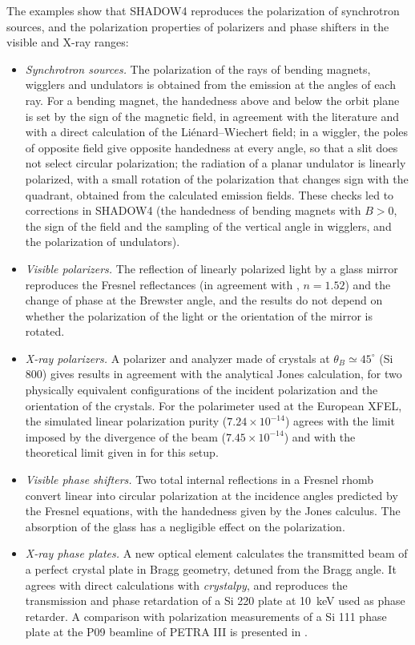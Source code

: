 \documentclass{iucr}
\begin{document}
The examples show that SHADOW4 reproduces the polarization of synchrotron sources, and the polarization properties of polarizers and phase shifters in the visible and X-ray ranges:
\begin{itemize}
\item {\it Synchrotron sources.} The polarization of the rays of bending magnets, wigglers and undulators is obtained from the emission at the angles of each ray. For a bending magnet, the handedness above and below the orbit plane is set by the sign of the magnetic field, in agreement with the literature and with a direct calculation of the Li\'enard--Wiechert field; in a wiggler, the poles of opposite field give opposite handedness at every angle, so that a slit does not select circular polarization; the radiation of a planar undulator is linearly polarized, with a small rotation of the polarization that changes sign with the quadrant, obtained from the calculated emission fields. These checks led to corrections in SHADOW4 (the handedness of bending magnets with $B>0$, the sign of the field and the sampling of the vertical angle in wigglers, and the polarization of undulators).
\item {\it Visible polarizers.} The reflection of linearly polarized light by a glass mirror reproduces the Fresnel reflectances (in agreement with \cite{born_wolf}, $n=1.52$) and the change of phase at the Brewster angle, and the results do not depend on whether the polarization of the light or the orientation of the mirror is rotated.
\item {\it X-ray polarizers.} A polarizer and analyzer made of crystals at $\theta_B\simeq45^\circ$ (Si 800) gives results in agreement with the analytical Jones calculation, for two physically equivalent configurations of the incident polarization and the orientation of the crystals. For the polarimeter used at the European XFEL, the simulated linear polarization purity ($7.24\times10^{-14}$) agrees with the limit imposed by the divergence of the beam ($7.45\times10^{-14}$) and with the theoretical limit given in \cite{Schulze2022} for this setup.
\item {\it Visible phase shifters.} Two total internal reflections in a Fresnel rhomb convert linear into circular polarization at the incidence angles predicted by the Fresnel equations, with the handedness given by the Jones calculus. The absorption of the glass has a negligible effect on the polarization.
\item {\it X-ray phase plates.} A new optical element calculates the transmitted beam of a perfect crystal plate in Bragg geometry, detuned from the Bragg angle. It agrees with direct calculations with {\it crystalpy}, and reproduces the transmission and phase retardation of a Si 220 plate at 10~keV used as phase retarder. A comparison with polarization measurements of a Si 111 phase plate at the P09 beamline of PETRA III is presented in \cite{SanchezdelRio2026desy}.
\end{itemize}
\end{document}
